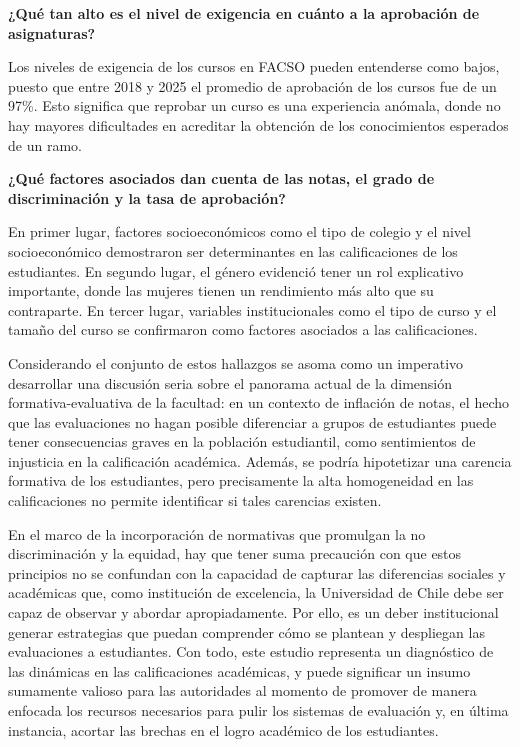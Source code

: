 \documentclass[
  spanish,
  a4paper,
  oneside]{scrbook}
\begin{document}
\textbf{¿Qué tan alto es el nivel de exigencia en cuánto a la aprobación
de asignaturas?}

Los niveles de exigencia de los cursos en FACSO pueden entenderse como
bajos, puesto que entre 2018 y 2025 el promedio de aprobación de los
cursos fue de un 97\%. Esto significa que reprobar un curso es una
experiencia anómala, donde no hay mayores dificultades en acreditar la
obtención de los conocimientos esperados de un ramo.

\textbf{¿Qué factores asociados dan cuenta de las notas, el grado de
discriminación y la tasa de aprobación?}

En primer lugar, factores socioeconómicos como el tipo de colegio y el
nivel socioeconómico demostraron ser determinantes en las calificaciones
de los estudiantes. En segundo lugar, el género evidenció tener un rol
explicativo importante, donde las mujeres tienen un rendimiento más alto
que su contraparte. En tercer lugar, variables institucionales como el
tipo de curso y el tamaño del curso se confirmaron como factores
asociados a las calificaciones.

Considerando el conjunto de estos hallazgos se asoma como un imperativo
desarrollar una discusión seria sobre el panorama actual de la dimensión
formativa-evaluativa de la facultad: en un contexto de inflación de
notas, el hecho que las evaluaciones no hagan posible diferenciar a
grupos de estudiantes puede tener consecuencias graves en la población
estudiantil, como sentimientos de injusticia en la calificación
académica. Además, se podría hipotetizar una carencia formativa de los
estudiantes, pero precisamente la alta homogeneidad en las
calificaciones no permite identificar si tales carencias existen.

En el marco de la incorporación de normativas que promulgan la no
discriminación y la equidad, hay que tener suma precaución con que estos
principios no se confundan con la capacidad de capturar las diferencias
sociales y académicas que, como institución de excelencia, la
Universidad de Chile debe ser capaz de observar y abordar
apropiadamente. Por ello, es un deber institucional generar estrategias
que puedan comprender cómo se plantean y despliegan las evaluaciones a
estudiantes. Con todo, este estudio representa un diagnóstico de las
dinámicas en las calificaciones académicas, y puede significar un insumo
sumamente valioso para las autoridades al momento de promover de manera
enfocada los recursos necesarios para pulir los sistemas de evaluación
y, en última instancia, acortar las brechas en el logro académico de los
estudiantes.
\end{document}
